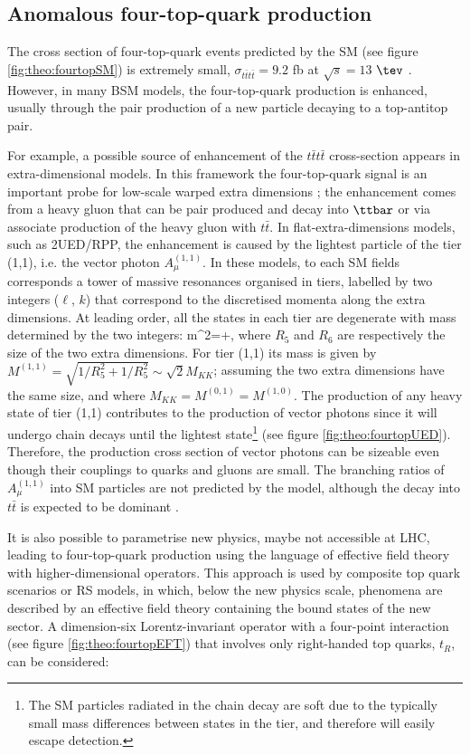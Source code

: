 \subsection{Anomalous four-top-quark production}
\label{sec:theo:fourtops}

The cross section of four-top-quark events predicted by the SM (see figure \ref{fig:theo:fourtopSM}) is extremely small, $\sigma_{t\bar{t}t\bar{t}}=9.2$ fb at $\sqrt{s} = 13$ $\tev$ \cite{Barger:1991vn}. 
However, in many BSM models, the four-top-quark production is enhanced, usually through the pair production of a new particle decaying to a top-antitop pair.\par
For example, a possible source of enhancement of the $t\bar{t}t\bar{t}$ cross-section appears in extra-dimensional models. In this framework the four-top-quark signal is an important probe for low-scale warped extra dimensions \cite{Jung:2010ms}; the enhancement comes from a heavy gluon that can be pair produced and decay into $\ttbar$ or via associate production of the heavy gluon with $t\bar{t}$. In flat-extra-dimensions models, such as 2UED/RPP, the enhancement is caused by the lightest particle of the tier (1,1), i.e. the vector photon $A_{\mu}^{(1,1)}$. In these models, to each SM fields corresponds a tower of massive resonances organised in tiers, labelled by two integers ($\ell$, $k$) that correspond to the discretised momenta along the extra dimensions. At leading order, all the states in each tier are degenerate with mass determined by the two integers:
\be
m^{2}=+,
\ee 
\noindent where $R_{5}$ and $R_{6}$ are respectively the size of the two extra dimensions. For tier (1,1) its mass is given by $M^{(1,1)}=\sqrt{1/R^{2}_{5}+1/R^{2}_{5}}\sim \sqrt{2}M_{KK}$; assuming the two extra dimensions have the same size, and where $M_{KK}=M^{(0,1)}=M^{(1,0)}$.
The production of any heavy state of tier (1,1) contributes to the production of vector photons since it will undergo chain decays until the lightest state\footnote{The SM particles radiated in the chain decay are soft due to the typically small mass differences between states in the tier, and therefore will easily escape detection.} (see figure \ref{fig:theo:fourtopUED}). Therefore, the production cross section of vector photons can be sizeable even though their couplings to quarks and gluons are small.
The branching ratios of $A_{\mu}^{(1,1)}$ into SM particles are not predicted by the model, although the decay into $t\bar{t}$ is expected to be dominant \cite{Cacciapaglia:2011kz}.\par It is also possible to parametrise new physics, maybe not accessible at LHC, leading to four-top-quark production using the language of effective field theory with higher-dimensional operators.  This approach is used by composite top quark scenarios or RS models, in which, below the new physics scale, phenomena are described by an effective field theory containing the bound states of the new sector.
A dimension-six Lorentz-invariant operator with a four-point interaction (see figure \ref{fig:theo:fourtopEFT}) that involves only right-handed top quarks, $t_{R}$, can be considered:

